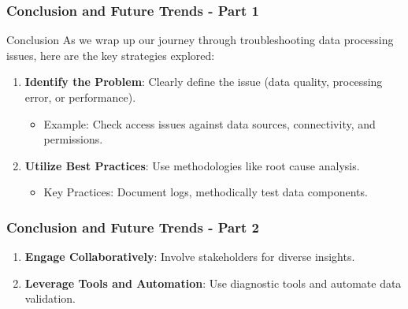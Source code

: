 \documentclass[aspectratio=169]{beamer}
\begin{document}
\begin{frame}[fragile]
    \frametitle{Conclusion and Future Trends - Part 1}
    \begin{block}{Conclusion}
        As we wrap up our journey through troubleshooting data processing issues, here are the key strategies explored:
    \end{block}
    \begin{enumerate}
        \item \textbf{Identify the Problem}: Clearly define the issue (data quality, processing error, or performance).
        \begin{itemize}
            \item Example: Check access issues against data sources, connectivity, and permissions.
        \end{itemize}
        \item \textbf{Utilize Best Practices}: Use methodologies like root cause analysis.
        \begin{itemize}
            \item Key Practices: Document logs, methodically test data components.
        \end{itemize}
    \end{enumerate}
\end{frame}

\begin{frame}[fragile]
    \frametitle{Conclusion and Future Trends - Part 2}
    \begin{enumerate}[resume]
        \item \textbf{Engage Collaboratively}: Involve stakeholders for diverse insights.
        \item \textbf{Leverage Tools and Automation}: Use diagnostic tools and automate data validation.
    \end{enumerate}
\end{frame}
\end{document}
